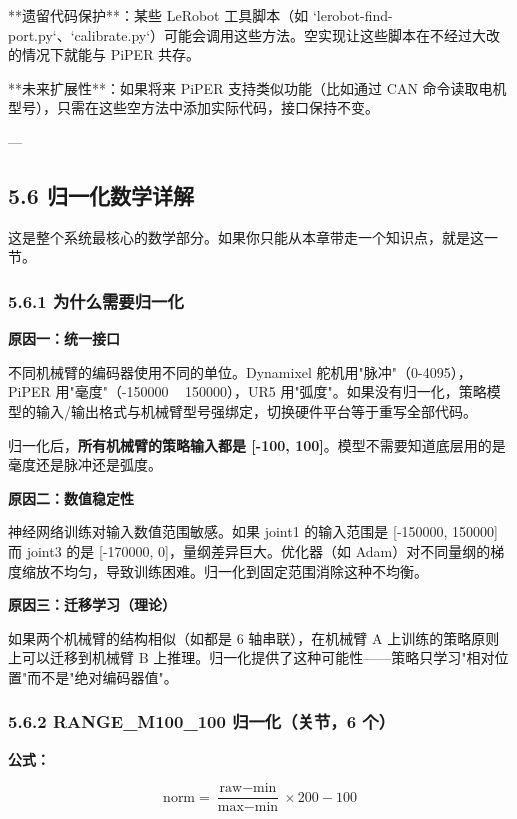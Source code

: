 \documentclass[UTF8,a4paper,11pt]{ctexart}
\begin{document}
{\item[2] **遗留代码保护**：某些 LeRobot 工具脚本（如 `lerobot-find-port.py`、`calibrate.py`）可能会调用这些方法。空实现让这些脚本在不经过大改的情况下就能与 PiPER 共存。

\item[3] **未来扩展性**：如果将来 PiPER 支持类似功能（比如通过 CAN 命令读取电机型号），只需在这些空方法中添加实际代码，接口保持不变。

---

\subsection{5.6 归一化数学详解}

这是整个系统最核心的数学部分。如果你只能从本章带走一个知识点，就是这一节。

\subsubsection{5.6.1 为什么需要归一化}

\textbf{原因一：统一接口}

不同机械臂的编码器使用不同的单位。Dynamixel 舵机用"脉冲"（0-4095），PiPER 用"毫度"（-150000 ~ 150000），UR5 用"弧度"。如果没有归一化，策略模型的输入/输出格式与机械臂型号强绑定，切换硬件平台等于重写全部代码。

归一化后，\textbf{所有机械臂的策略输入都是 [-100, 100]}。模型不需要知道底层用的是毫度还是脉冲还是弧度。

\textbf{原因二：数值稳定性}

神经网络训练对输入数值范围敏感。如果 joint1 的输入范围是 [-150000, 150000] 而 joint3 的是 [-170000, 0]，量纲差异巨大。优化器（如 Adam）对不同量纲的梯度缩放不均匀，导致训练困难。归一化到固定范围消除这种不均衡。

\textbf{原因三：迁移学习（理论）}

如果两个机械臂的结构相似（如都是 6 轴串联），在机械臂 A 上训练的策略原则上可以迁移到机械臂 B 上推理。归一化提供了这种可能性——策略只学习"相对位置"而不是"绝对编码器值"。

\subsubsection{5.6.2 RANGE_M100_100 归一化（关节，6 个）}

\textbf{公式：}

$$\text{norm} = \frac{\text{raw} - \text{min}}{\text{max} - \text{min}} \times 200 - 100$$

}
\end{document}
